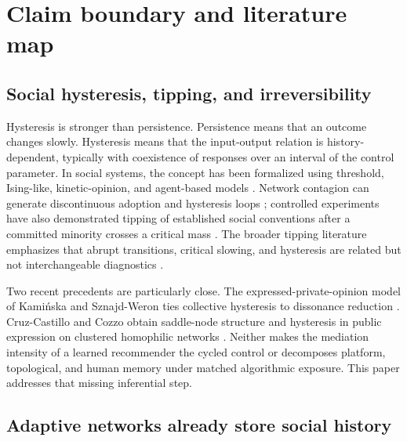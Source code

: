 \documentclass[pdflatex,sn-mathphys-num]{sn-jnl}
\begin{document}
\section{Claim boundary and literature map}

\subsection{Social hysteresis, tipping, and irreversibility}

Hysteresis is stronger than persistence. Persistence means that an outcome changes slowly. Hysteresis means that the input-output relation is history-dependent, typically with coexistence of responses over an interval of the control parameter. In social systems, the concept has been formalized using threshold, Ising-like, kinetic-opinion, and agent-based models \cite{sznajdweron2024toward,nowak2020threshold,oestereich2020hysteresis,macy2021polarization}. Network contagion can generate discontinuous adoption and hysteresis loops \cite{su2017contagion}; controlled experiments have also demonstrated tipping of established social conventions after a committed minority crosses a critical mass \cite{centola2018tipping}. The broader tipping literature emphasizes that abrupt transitions, critical slowing, and hysteresis are related but not interchangeable diagnostics \cite{scheffer2009warning,wiedermann2020threshold}.

Two recent precedents are particularly close. The expressed-private-opinion model of Kami\'nska and Sznajd-Weron ties collective hysteresis to dissonance reduction \cite{kaminska2025cognitive}. Cruz-Castillo and Cozzo obtain saddle-node structure and hysteresis in public expression on clustered homophilic networks \cite{cruzcastillo2026spiral}. Neither makes the mediation intensity of a learned recommender the cycled control or decomposes platform, topological, and human memory under matched algorithmic exposure. This paper addresses that missing inferential step.

\subsection{Adaptive networks already store social history}
\end{document}
